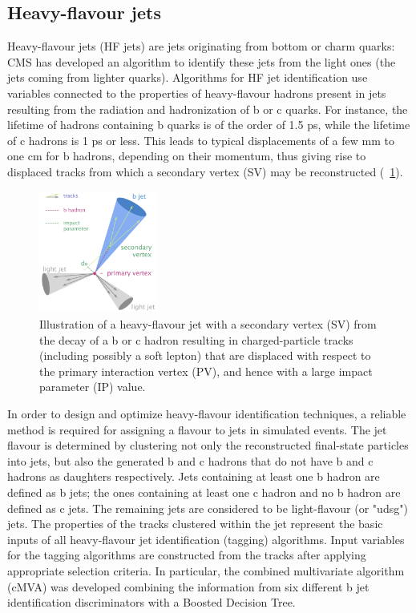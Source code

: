 \subsection{Heavy-flavour jets}
Heavy-flavour jets (HF jets) \cite{HF_Jets} are jets originating from bottom or charm quarks: CMS has developed an algorithm to identify these jets from the light ones (the jets coming from lighter quarks). Algorithms for HF jet identification use variables connected to the properties of heavy-flavour hadrons present in jets resulting from the radiation and hadronization of b or c quarks. For instance, the lifetime of hadrons containing b quarks is of the order of 1.5 ps, while the lifetime of c hadrons is 1 ps or less. This leads to typical displacements of a few mm to one cm for b hadrons, depending on their momentum, thus giving rise to displaced tracks from which a secondary vertex (SV) may be reconstructed (\figurename~\ref{bJet_SV}).
\begin{figure}[htbp]
\centering
\includegraphics[width=0.35\textwidth]{Images/bJet_SV}
\caption{Illustration of a heavy-flavour jet with a secondary vertex (SV) from the decay of a b or c hadron resulting in charged-particle tracks (including possibly a soft lepton) that are displaced with respect to the primary interaction vertex (PV), and hence with a large impact parameter (IP) value.}
\label{bJet_SV}
\end{figure}
In order to design and optimize heavy-flavour identification techniques, a reliable method is required for assigning a flavour to jets in simulated events. The jet flavour is determined by clustering not only the reconstructed final-state particles into jets, but also the generated b and c hadrons that do not have b and c hadrons as daughters respectively. Jets containing at least one b hadron are defined as b jets; the ones containing at least one c hadron and no b hadron are defined as c jets. The remaining jets are considered to be light-flavour (or "udsg") jets. The properties of the tracks clustered within the jet represent the basic inputs of all heavy-flavour jet identification (tagging) algorithms. Input variables for the tagging algorithms are constructed from the tracks after applying appropriate selection criteria. In particular, the combined multivariate algorithm (cMVA) was developed combining the information from six different b jet identification discriminators with a Boosted Decision Tree.


